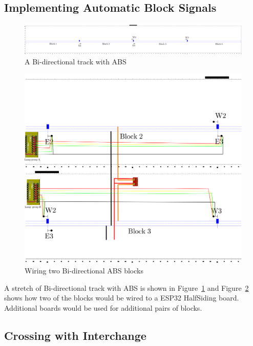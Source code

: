  

\clearpage
\subsection{Implementing Automatic Block Signals}

\begin{figure}[hbpt]\begin{centering}%
\includegraphics[width=5in]{ABSTrack_Annotated.png}
\caption{A Bi-directional track with ABS}
\label{fig:ABSTrack}
\end{centering}\end{figure}
\begin{figure}[hbpt]\begin{centering}%
\includegraphics[width=5in]{ABSTrack_Wiring.png}
\caption{Wiring two Bi-directional ABS blocks}
\label{fig:ABSTrack_Wiring}
\end{centering}\end{figure}
A stretch of Bi-directional track with ABS is shown in 
Figure~\ref{fig:ABSTrack} and Figure~\ref{fig:ABSTrack_Wiring} shows how two 
of the blocks would be wired to a ESP32 HalfSiding board. Additional boards 
would be used for additional pairs of blocks.


\clearpage
\subsection{Crossing with Interchange}



